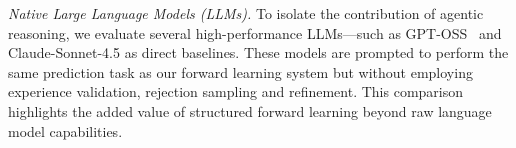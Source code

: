 \textit{Native Large Language Models (LLMs).} To isolate the contribution of agentic reasoning, we evaluate several high-performance LLMs—such as GPT-OSS~\cite{agarwal2025gpt} and Claude-Sonnet-4.5 as direct baselines. These models are prompted to perform the same prediction task as our forward learning system but without employing experience validation, rejection sampling and refinement. This comparison highlights the added value of structured forward learning beyond raw language model capabilities.


\begin{table}[t!]
\centering
\caption{Ablation study results in ProteinGym benchmark of forward learning paradigm component techniques: \textbf{Experience Exploration}, \textbf{Experience Evolution}, \textbf{Assistance of Regression tools}. Where Fixed mean best one for all regression tools is used instead of each different regression tools for protein target selected by agent.}
\label{tab:proteingym_ablation_matrix}

\end{table}


